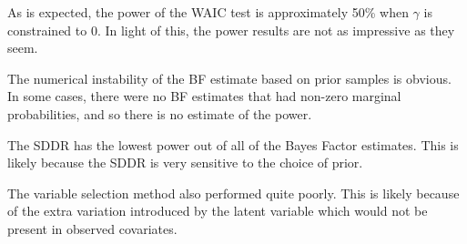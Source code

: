 \documentclass[10pt,letterpaper]{article}
\begin{document}
As is expected, the power of the WAIC test is approximately 50\% when
\(\gamma\) is constrained to 0. In light of this, the power results are
not as impressive as they seem.

The numerical instability of the BF estimate based on prior samples is
obvious. In some cases, there were no BF estimates that had non-zero
marginal probabilities, and so there is no estimate of the power.

The SDDR has the lowest power out of all of the Bayes Factor estimates.
This is likely because the SDDR is very sensitive to the choice of
prior.

The variable selection method also performed quite poorly. This is
likely because of the extra variation introduced by the latent variable
which would not be present in observed covariates.
\nolinenumbers

%
%
%
\end{document}
